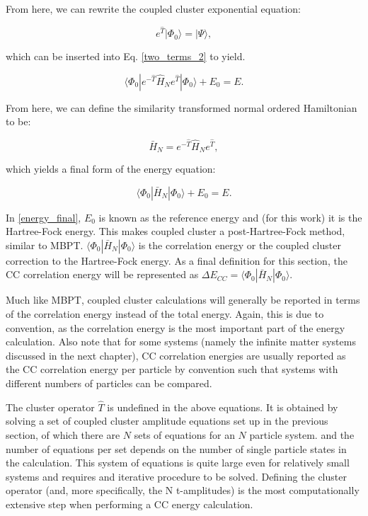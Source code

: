 From here, we can rewrite the coupled cluster exponential equation:

\begin{equation}
	e^{\hat{T}}|\Phi_0\rangle = |\Psi\rangle,
\end{equation}

which can be inserted into Eq. \ref{two_terms_2} to yield.

\begin{equation}
	\langle \Phi_0 | e^{-\hat{T}}\hat{H}_Ne^{\hat{T}} | \Phi_0 \rangle + E_0 = E.
\end{equation}

From here, we can define the similarity transformed normal ordered Hamiltonian to be:

\begin{equation}
	\bar{H}_N = e^{-\hat{T}}\hat{H}_Ne^{\hat{T}}, 
\end{equation}

which yields a final form of the energy equation:

\begin{equation}\label{energy_final}
	\langle \Phi_0 | \bar{H}_N | \Phi_0 \rangle + E_0 = E.
\end{equation}

In \ref{energy_final}, $E_0$ is known as the reference energy and (for this work) it is the Hartree-Fock energy. This makes coupled cluster a post-Hartree-Fock method, similar to MBPT. $\langle \Phi_0 | \bar{H}_N | \Phi_0 \rangle$ is the correlation energy or the coupled cluster correction to the Hartree-Fock energy. As a final definition for this section, the CC correlation energy will be represented as $\Delta E_{CC} = \langle \Phi_0 | \bar{H}_N | \Phi_0 \rangle$.

Much like MBPT, coupled cluster calculations will generally be reported in terms of the correlation energy instead of the total energy. Again, this is due to convention, as the correlation energy is the most important part of the energy calculation. Also note that for some systems (namely the infinite matter systems discussed in the next chapter), CC correlation energies are usually reported as the CC correlation energy per particle by convention such that systems with different numbers of particles can be compared.

The cluster operator $\hat{T}$ is undefined in the above equations. It is obtained by solving a set of coupled cluster amplitude equations set up in the previous section, of which there are $N$ sets of equations for an $N$ particle system. and the number of equations per set depends on the number of single particle states in the calculation. This system of equations is quite large even for relatively small systems and requires and iterative procedure to be solved. Defining the cluster operator (and, more specifically, the N t-amplitudes) is the most computationally extensive step when performing a CC energy calculation.
